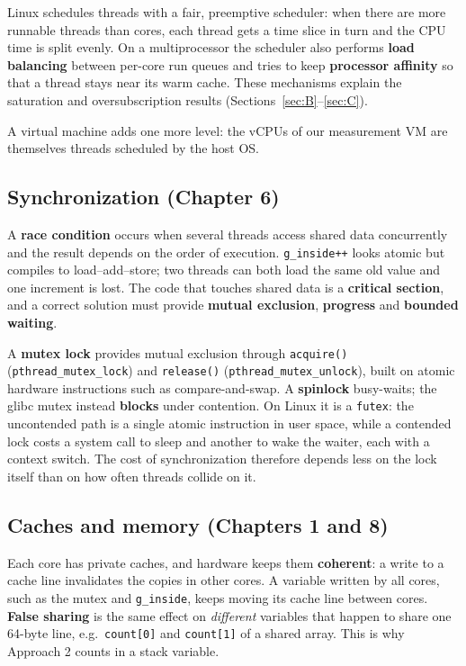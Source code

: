 \documentclass[11pt,a4paper]{article}
\newcommand{\code}[1]{\texttt{#1}}
\begin{document}
Linux schedules threads with a fair, preemptive scheduler: when there are more runnable threads than cores, each thread gets a time slice in turn and the CPU time is split evenly. On a multiprocessor the scheduler also performs \textbf{load balancing} between per-core run queues and tries to keep \textbf{processor affinity} so that a thread stays near its warm cache. These mechanisms explain the saturation and oversubscription results (Sections~\ref{sec:B}--\ref{sec:C}).

A virtual machine adds one more level: the vCPUs of our measurement VM are themselves threads scheduled by the host OS.

\subsection{Synchronization (Chapter 6)}
A \textbf{race condition} occurs when several threads access shared data concurrently and the result depends on the order of execution. \code{g\_inside++} looks atomic but compiles to load--add--store; two threads can both load the same old value and one increment is lost. The code that touches shared data is a \textbf{critical section}, and a correct solution must provide \textbf{mutual exclusion}, \textbf{progress} and \textbf{bounded waiting}.

A \textbf{mutex lock} provides mutual exclusion through \code{acquire()} (\code{pthread\_mutex\_lock}) and \code{release()} (\code{pthread\_mutex\_unlock}), built on atomic hardware instructions such as compare-and-swap. A \textbf{spinlock} busy-waits; the glibc mutex instead \textbf{blocks} under contention. On Linux it is a \code{futex}: the uncontended path is a single atomic instruction in user space, while a contended lock costs a system call to sleep and another to wake the waiter, each with a context switch. The cost of synchronization therefore depends less on the lock itself than on how often threads collide on it.

\subsection{Caches and memory (Chapters 1 and 8)}
Each core has private caches, and hardware keeps them \textbf{coherent}: a write to a cache line invalidates the copies in other cores. A variable written by all cores, such as the mutex and \code{g\_inside}, keeps moving its cache line between cores. \textbf{False sharing} is the same effect on \emph{different} variables that happen to share one 64-byte line, e.g.\ \code{count[0]} and \code{count[1]} of a shared array. This is why Approach 2 counts in a stack variable.
\end{document}
